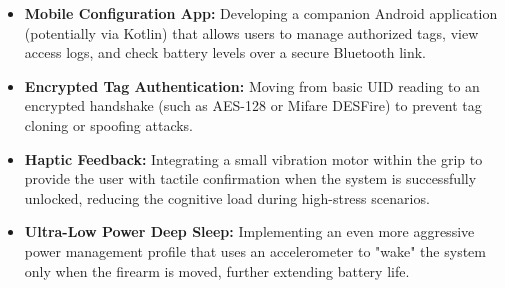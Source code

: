 \begin{itemize}
    \item \textbf{Mobile Configuration App:} Developing a companion Android application (potentially via Kotlin) that allows users to manage authorized tags, view access logs, and check battery levels over a secure Bluetooth link.
    \item \textbf{Encrypted Tag Authentication:} Moving from basic UID reading to an encrypted handshake (such as AES-128 or Mifare DESFire) to prevent tag cloning or spoofing attacks.
    \item \textbf{Haptic Feedback:} Integrating a small vibration motor within the grip to provide the user with tactile confirmation when the system is successfully unlocked, reducing the cognitive load during high-stress scenarios.
    \item \textbf{Ultra-Low Power Deep Sleep:} Implementing an even more aggressive power management profile that uses an accelerometer to "wake" the system only when the firearm is moved, further extending battery life.
\end{itemize}
